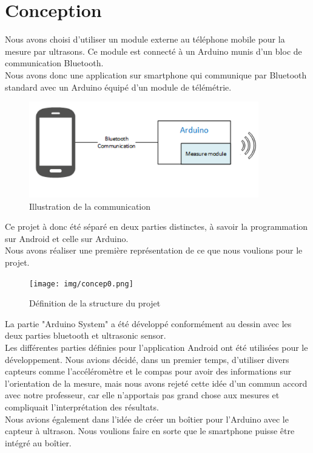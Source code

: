 \section{Conception}
Nous avons choisi d'utiliser un module externe au téléphone mobile pour la mesure par ultrasons. Ce module est connecté à un Arduino munis d'un bloc de communication Bluetooth.\\
Nous avons donc une application sur smartphone qui communique par Bluetooth standard avec un Arduino équipé d'un module de télémétrie.
\begin{figure}[H]
	\begin{center}
		\includegraphics[width=10cm]{img/schemaBloc.png}
		\caption{Illustration de la communication}
		\label{schemabloc}
	\end{center}
\end{figure}
Ce projet à donc été séparé en deux parties distinctes, à savoir la programmation sur Android et celle sur Arduino.\\
Nous avons réaliser une première représentation de ce que nous voulions pour le projet.
\begin{figure}[H]
	\begin{center}
		\texttt{[image: img/concep0.png]}
		\caption{Définition de la structure du projet}
		\label{conception0}
	\end{center}
\end{figure}
La partie "Arduino System" a été développé conformément au dessin avec les deux parties bluetooth et ultrasonic sensor.\\
Les différentes parties définies pour l'application Android ont été utilisées pour le développement. Nous avions décidé, dans un premier temps, d'utiliser divers capteurs comme l'accéléromètre et le compas pour avoir des informations sur l'orientation de la mesure, mais nous avons rejeté cette idée d'un commun accord avec notre professeur, car elle n'apportais pas grand chose aux mesures et compliquait l'interprétation des résultats.\\
Nous avions également dans l'idée de créer un boîtier pour l'Arduino avec le capteur à ultrason. Nous voulions faire en sorte que le smartphone puisse être intégré au boîtier. \\

